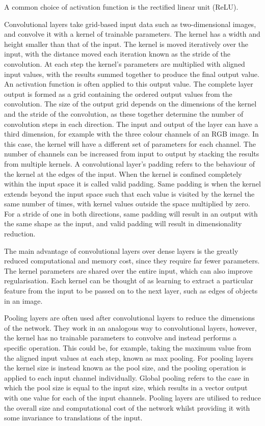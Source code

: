 \documentclass[12pt]{article}
\begin{document}
A common choice of activation function is the rectified linear unit (ReLU).

Convolutional layers take grid-based input data such as two-dimensional images, and convolve it with a kernel of trainable parameters. The kernel has a width and height smaller than that of the input. The kernel is moved iteratively over the input, with the distance moved each iteration known as the stride of the convolution. At each step the kernel's parameters are multiplied with aligned input values, with the results summed together to produce the final output value. An activation function is often applied to this output value. The complete layer output is formed as a grid containing the ordered output values from the convolution. The size of the output grid depends on the dimensions of the kernel and the stride of the convolution, as these together determine the number of convolution steps in each direction. The input and output of the layer can have a third dimension, for example with the three colour channels of an RGB image. In this case, the kernel will have a different set of parameters for each channel. The number of channels can be increased from input to output by stacking the results from multiple kernels. A convolutional layer's padding refers to the behaviour of the kernel at the edges of the input. When the kernel is confined completely within the input space it is called valid padding. Same padding is when the kernel extends beyond the input space such that each value is visited by the kernel the same number of times, with kernel values outside the space multiplied by zero. For a stride of one in both directions, same padding will result in an output with the same shape as the input, and valid padding will result in dimensionality reduction.

The main advantage of convolutional layers over dense layers is the greatly reduced computational and memory cost, since they require far fewer parameters. The kernel parameters are shared over the entire input, which can also improve regularisation. Each kernel can be thought of as learning to extract a particular feature from the input to be passed on to the next layer, such as edges of objects in an image.

Pooling layers are often used after convolutional layers to reduce the dimensions of the network. They work in an analogous way to convolutional layers, however, the kernel has no trainable parameters to convolve and instead performs a specific operation. This could be, for example, taking the maximum value from the aligned input values at each step, known as max pooling. For pooling layers the kernel size is instead known as the pool size, and the pooling operation is applied to each input channel individually. Global pooling refers to the case in which the pool size is equal to the input size, which results in a vector output with one value for each of the input channels. Pooling layers are utilised to reduce the overall size and computational cost of the network whilst providing it with some invariance to translations of the input.
\end{document}
